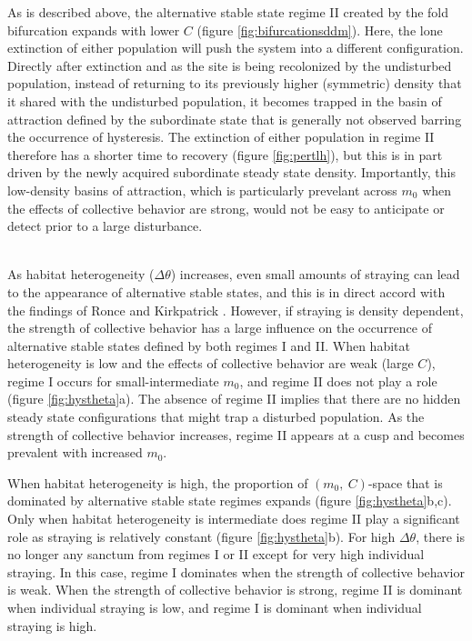 \documentclass{revtex4}
\begin{document}
As is described above, the alternative stable state regime II created by the fold bifurcation expands with lower $C$ (figure \ref{fig:bifurcationsddm}).
Here, the lone extinction of either population will push the system into a different configuration.
Directly after extinction and as the site is being recolonized by the undisturbed population, instead of returning to its previously higher (symmetric) density that it shared with the undisturbed population, it becomes trapped in the basin of attraction defined by the subordinate state that is generally not observed barring the occurrence of hysteresis.
The extinction of either population in regime II therefore has a shorter time to recovery (figure \ref{fig:pertlh}), but this is in part driven by the newly acquired subordinate steady state density.
Importantly, this low-density basins of attraction, which is particularly prevelant across $m_0$ when the effects of collective behavior are strong, would not be easy to anticipate or detect prior to a large disturbance.


\\
As habitat heterogeneity ($\Delta\theta$) increases, even small amounts of straying can lead to the appearance of alternative stable states, and this is in direct accord with the findings of Ronce and Kirkpatrick \citep{Ronce:2001dp}.
However, if straying is density dependent, the strength of collective behavior  has a large influence on the occurrence of alternative stable states defined by both regimes I and II.
When habitat heterogeneity is low and the effects of collective behavior are weak (large $C$), regime I occurs for small-intermediate $m_0$, and regime II does not play a role (figure \ref{fig:hystheta}a).
The absence of regime II implies that there are no hidden steady state configurations that might trap a disturbed population.
As the strength of collective behavior increases, regime II appears at a cusp and becomes prevalent with increased $m_0$.

When habitat heterogeneity is high, the proportion of $(m_0,~C)$-space that is dominated by alternative stable state regimes expands (figure \ref{fig:hystheta}b,c).
Only when habitat heterogeneity is intermediate does regime II play a significant role as straying is relatively constant (figure \ref{fig:hystheta}b).
For high $\Delta\theta$, there is no longer any sanctum from regimes I or II except for very high individual straying.
In this case, regime I dominates when the strength of collective behavior is weak.
When the strength of collective behavior is strong, regime II is dominant when individual straying is low, and regime I is dominant when individual straying is high.
\end{document}

